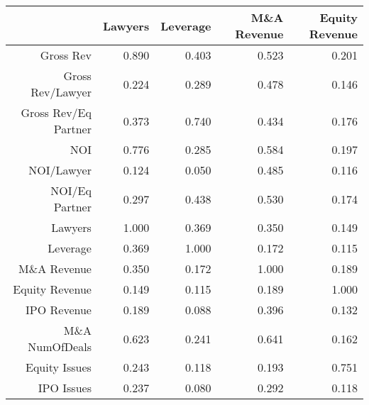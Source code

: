 \begin{table}[ht]
\centering
\begin{tabular}{rrrrr}
  \hline
 & Lawyers & Leverage & M\&A Revenue & Equity Revenue \\ 
  \hline
Gross Rev & 0.890 & 0.403 & 0.523 & 0.201 \\ 
  Gross Rev/Lawyer & 0.224 & 0.289 & 0.478 & 0.146 \\ 
  Gross Rev/Eq Partner & 0.373 & 0.740 & 0.434 & 0.176 \\ 
  NOI & 0.776 & 0.285 & 0.584 & 0.197 \\ 
  NOI/Lawyer & 0.124 & 0.050 & 0.485 & 0.116 \\ 
  NOI/Eq Partner & 0.297 & 0.438 & 0.530 & 0.174 \\ 
  Lawyers & 1.000 & 0.369 & 0.350 & 0.149 \\ 
  Leverage & 0.369 & 1.000 & 0.172 & 0.115 \\ 
  M\&A Revenue & 0.350 & 0.172 & 1.000 & 0.189 \\ 
  Equity Revenue & 0.149 & 0.115 & 0.189 & 1.000 \\ 
  IPO Revenue & 0.189 & 0.088 & 0.396 & 0.132 \\ 
  M\&A NumOfDeals & 0.623 & 0.241 & 0.641 & 0.162 \\ 
  Equity Issues & 0.243 & 0.118 & 0.193 & 0.751 \\ 
  IPO Issues & 0.237 & 0.080 & 0.292 & 0.118 \\ 
   \hline
\end{tabular}
\end{table}
